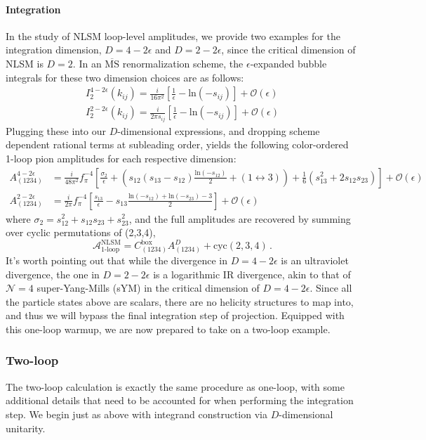 \documentclass[11pt,letter]{article}
\begin{document}
\paragraph{\textbf{Integration}}  In the study of NLSM loop-level amplitudes, we provide two examples for the integration dimension, $D=4-2\epsilon$ and $D=2-2\epsilon$, since the critical dimension of NLSM is $D=2$. In an $\overline{\text{MS}}$ renormalization scheme, the $\epsilon$-expanded bubble integrals for these two dimension choices are as follows:
\begin{align}
I_2^{4-2\epsilon}(k_{ij}) = \frac{i}{16\pi^2}\left[\frac{1}{\epsilon} - \text{ln}(-s_{ij})\right]+\mathcal{O}(\epsilon)
\\
I_2^{2-2\epsilon}(k_{ij}) = \frac{i}{2\pi s_{ij}}\left[\frac{1}{\epsilon} - \text{ln}(-s_{ij})\right]+\mathcal{O}(\epsilon)
\end{align}
Plugging these into our $D$-dimensional expressions, and dropping scheme dependent rational terms at subleading order, yields the following color-ordered 1-loop pion amplitudes for each respective dimension:
\begin{align}
A^{4-2\epsilon}_{(1234)} &=\frac{i}{48\pi^2 }f_{\pi}^{-4}\left[\frac{\sigma_2}{\epsilon}+\left(s_{12}(s_{13}-s_{12})\frac{\text{ln}(-s_{12})}{2}+(1\leftrightarrow 3)\right)+\frac{1}{6}(s_{13}^2 + 2s_{12}s_{23})\right]+\mathcal{O}(\epsilon)
\\
A^{2-2\epsilon}_{(1234)} &= \frac{i}{2\pi }f_{\pi}^{-4}\left[\frac{s_{13}}{\epsilon}-s_{13}\frac{\text{ln}(-s_{12})+\text{ln}(-s_{23})-3}{2}\right] +\mathcal{O}(\epsilon) \label{eq:1loopPionD2}
\end{align}
where $\sigma_2=s_{12}^2+s_{12}s_{23}+s_{23}^2$, and the full amplitudes are recovered by summing over cyclic permutations of (2,3,4), 
\begin{equation}
\mathcal{A}^{\text{NLSM}}_{\text{1-loop}} = C^{\text{box}}_{(1234)}A^{D}_{(1234)}+\text{cyc}(2,3,4)\,.
\end{equation} 
It's worth pointing out that while the divergence in $D=4-2\epsilon$ is an ultraviolet divergence, the one in $D=2-2\epsilon$ is a logarithmic IR divergence, akin to that of $\mathcal{N}=4$ super-Yang-Mills (sYM) in the critical dimension of $D=4-2\epsilon$. Since all the particle states above are scalars, there are no helicity structures to map into, and thus we will bypass the final integration step of {projection}. Equipped with this one-loop warmup, we are now prepared to take on a two-loop example. 
\subsubsection{Two-loop}\label{sec:2loopNLSM}
The two-loop calculation is exactly the same procedure as one-loop, with some additional details that need to be accounted for when performing the integration step. We begin just as above with integrand construction via $D$-dimensional unitarity. 
\end{document}
